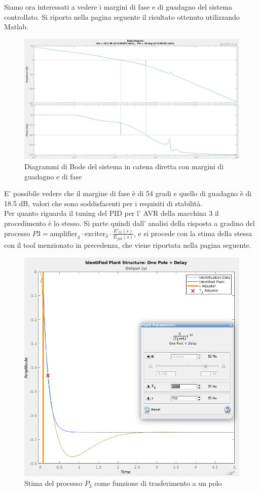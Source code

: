 \documentclass[Lau,noexaminfo]{sapthesis}
\begin{document}
	Siamo ora interessati a vedere i margini di fase e di guadagno del sistema controllato. Si riporta nella pagina seguente il risultato ottenuto utilizzando Matlab.
	\begin{figure}
		\centering
		\includegraphics[scale=1.09]{margin_P2}
		\caption{Diagrammi di Bode del sistema in catena diretta con margini di guadagno e di fase}
	\end{figure}
	E' possibile vedere che il margine di fase è di 54 gradi e quello di guadagno è di 18.5 dB, valori che sono soddisfacenti per i requisiti di stabilità.\\
	Per quanto riguarda il tuning del PID per l' AVR della macchina 3 il procedimento è lo stesso. Si parte quindi dall' analisi della risposta a gradino del processo $P3=\text{amplifier}_3\cdot\text{exciter}_3\cdot \frac{E'_{t3}(s)}{E_{fd3}(s)}$, e si procede con la stima della stessa con il tool menzionato in precedenza, che viene riportata nella pagina seguente.
	\begin{figure}
		\centering
			\includegraphics[scale=2]{P3_estimating}
			\caption{Stima del processo $P_3$ come funzione di trasferimento a un polo}
	\end{figure}
\end{document}
